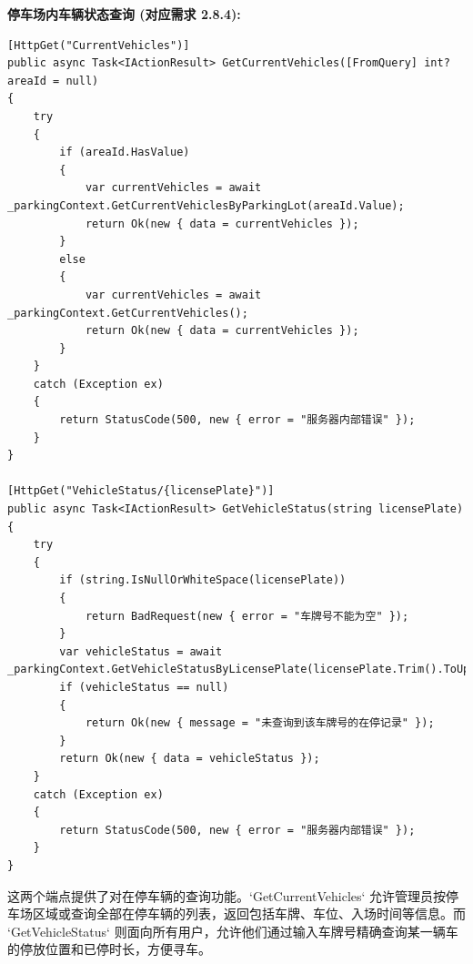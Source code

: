 \documentclass[]{article}
\begin{document}
\textbf{停车场内车辆状态查询 (对应需求 2.8.4):}
\begin{verbatim}
[HttpGet("CurrentVehicles")]
public async Task<IActionResult> GetCurrentVehicles([FromQuery] int? areaId = null)
{
    try
    {
        if (areaId.HasValue)
        {
            var currentVehicles = await _parkingContext.GetCurrentVehiclesByParkingLot(areaId.Value);
            return Ok(new { data = currentVehicles });
        }
        else
        {
            var currentVehicles = await _parkingContext.GetCurrentVehicles();
            return Ok(new { data = currentVehicles });
        }
    }
    catch (Exception ex)
    {
        return StatusCode(500, new { error = "服务器内部错误" });
    }
}

[HttpGet("VehicleStatus/{licensePlate}")]
public async Task<IActionResult> GetVehicleStatus(string licensePlate)
{
    try
    {
        if (string.IsNullOrWhiteSpace(licensePlate))
        {
            return BadRequest(new { error = "车牌号不能为空" });
        }
        var vehicleStatus = await _parkingContext.GetVehicleStatusByLicensePlate(licensePlate.Trim().ToUpper());
        if (vehicleStatus == null)
        {
            return Ok(new { message = "未查询到该车牌号的在停记录" });
        }
        return Ok(new { data = vehicleStatus });
    }
    catch (Exception ex)
    {
        return StatusCode(500, new { error = "服务器内部错误" });
    }
}
\end{verbatim}
这两个端点提供了对在停车辆的查询功能。`GetCurrentVehicles` 允许管理员按停车场区域或查询全部在停车辆的列表，返回包括车牌、车位、入场时间等信息。而 `GetVehicleStatus` 则面向所有用户，允许他们通过输入车牌号精确查询某一辆车的停放位置和已停时长，方便寻车。
\end{document}
